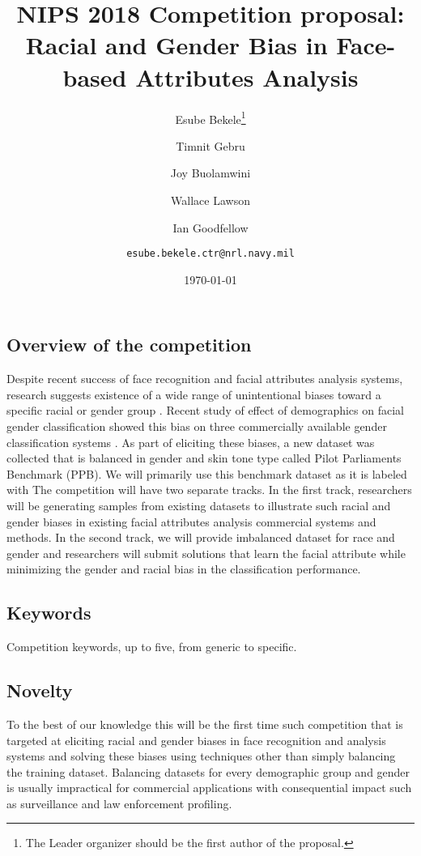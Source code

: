 \documentclass[11pt, oneside]{article}
\title{NIPS 2018 Competition proposal: Racial and Gender Bias in Face-based Attributes Analysis}
\author{Esube Bekele\thanks{The Leader organizer should be the first author of the proposal.} \and Timnit Gebru \and Joy Buolamwini \and Wallace Lawson \and Ian Goodfellow \\ \and
{\tt esube.bekele.ctr@nrl.navy.mil}\\
}
\date{\today}
\begin{document}
\maketitle

\subsection{Overview of the competition}
Despite recent success of face recognition and facial attributes  analysis systems, research suggests existence of a wide range of unintentional biases toward a specific racial or gender group \cite{phillips2011other} \cite{klare2012face}. 
Recent study of effect of demographics on facial gender classification showed this bias on three commercially available gender classification systems \cite{buolamwini2018gender}. As part of eliciting these biases, a new dataset was collected that is balanced in gender and skin tone type called Pilot Parliaments Benchmark (PPB). We will primarily use this benchmark dataset as it is labeled with 
The competition will have two separate tracks. In the first track, researchers will be generating samples from existing datasets to illustrate such racial and gender biases in existing facial attributes analysis commercial systems and methods. In the second track, we will provide imbalanced dataset for race and gender and researchers will submit solutions that learn the facial attribute while minimizing the gender and racial bias in the classification performance.

\subsection{Keywords}
Competition keywords, up to five, from generic to specific.

\subsection{Novelty}
To the best of our knowledge this will be the first time such competition that is targeted at eliciting racial and gender biases in face recognition and analysis systems and solving these biases using techniques other than simply balancing the training dataset. Balancing datasets for every demographic group and gender is usually impractical for commercial applications with consequential impact such as surveillance and law enforcement profiling.
\end{document}
